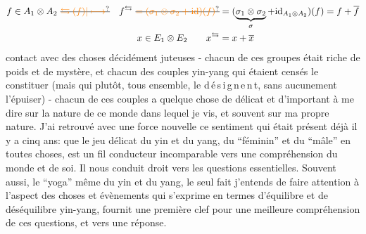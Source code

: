 \[
\begin{aligned}
f\in A_1\otimes A_2\ \deleted{\unsure{\leftrightarrows(f)|\longmapsto}}\quad
f^{\leftrightarrows}\ \deleted{\unsure{=(\sigma_1\otimes\sigma_2+\mathrm{id})(f)}}&=
(\underbrace{\sigma_1\otimes\sigma_2}_{\sigma}+\mathrm{id}_{A_1\otimes A_2})(f)=f+\overline f\\
x\in E_1\otimes E_2\qquad x^{\leftrightarrows}&=x+\overline x
\end{aligned}
\]
contact avec des choses décidément juteuses - chacun de ces groupes était riche de poids et de mystère, et chacun des couples yin-yang qui étaient censés le constituer (mais qui plutôt, tous ensemble, le d\,é\,s\,i\,g\,n\,e\,n\,t, sans aucunement l'épuiser) - chacun de ces couples a quelque chose de délicat et d'important à me dire sur la nature de ce monde dans lequel je vis, et souvent sur ma propre nature. J'ai retrouvé avec une force nouvelle ce sentiment qui était présent déjà il y a cinq ans: que le jeu délicat du yin et du yang, du ``féminin'' et du ``mâle'' en toutes choses, est un fil conducteur incomparable vers une compréhension du monde et de soi. Il nous conduit droit vers les questions essentielles. Souvent aussi, le ``yoga'' même du yin et du yang, le seul fait\handwritten{,} j'entends\handwritten{,} de faire attention à l'aspect des choses et évènements qui s'exprime en termes d'équilibre et de déséquilibre yin-yang, fournit une première clef pour une meilleure compréhension de ces questions, et vers une réponse.

